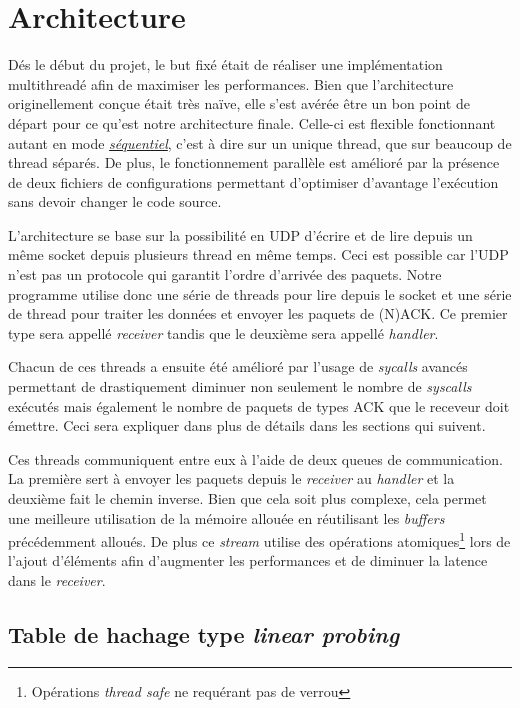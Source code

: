 \documentclass[../main.tex]{subfiles}
\begin{document}
\section{Architecture}
\label{sec:architecture}

Dés le début du projet, le but fixé était de réaliser une implémentation multithreadé afin de maximiser les performances. Bien que l'architecture 
 originellement conçue était très naïve, elle s'est avérée être un bon point de départ pour ce qu'est notre architecture finale. Celle-ci est flexible
fonctionnant autant en mode \hyperref[sec:sequential]{\textit{séquentiel}}, c'est à dire sur un unique thread, que sur beaucoup de thread séparés. De plus, le fonctionnement parallèle
est amélioré par la présence de deux fichiers de configurations permettant d'optimiser d'avantage l'exécution sans devoir changer le code source.

L'architecture se base sur la possibilité en UDP d'écrire et de lire depuis un même socket depuis plusieurs thread en même temps. Ceci est possible car l'UDP
n'est pas un protocole qui garantit l'ordre d'arrivée des paquets. Notre programme utilise donc une série de threads pour lire depuis le socket et une série
de thread pour traiter les données et envoyer les paquets de (N)ACK. Ce premier type sera appellé \textit{receiver} tandis que le deuxième sera appellé \textit{handler}.

Chacun de ces threads a ensuite été amélioré par l'usage de \textit{sycalls} avancés permettant de drastiquement diminuer non seulement le nombre de \textit{syscalls}
exécutés mais également le nombre de paquets de types ACK que le receveur doit émettre. Ceci sera expliquer dans plus de détails dans les sections
qui suivent.

Ces threads communiquent entre eux à l'aide de deux queues de communication. La première sert à envoyer les paquets depuis le \textit{receiver} au \textit{handler}
et la deuxième fait le chemin inverse. Bien que cela soit plus complexe, cela permet une meilleure utilisation de la mémoire allouée en réutilisant les
\textit{buffers} précédemment alloués. De plus ce \textit{stream} utilise des opérations atomiques\footnote{ Opérations \textit{thread safe} ne requérant pas de verrou}
lors de l'ajout d'éléments afin d'augmenter les performances et de diminuer la latence dans le \textit{receiver}.

\subsection{Table de hachage type \textit{linear probing}}
\label{sec:hash_table}
\end{document}
